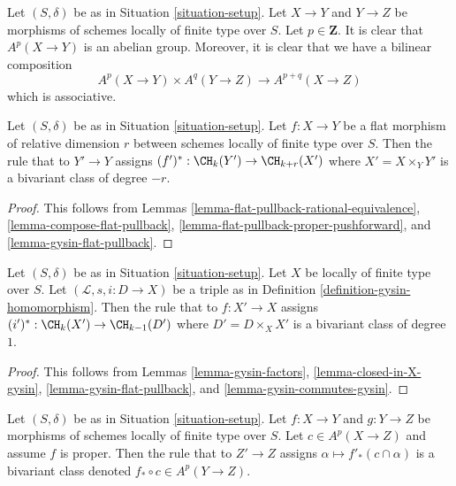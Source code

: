 \noindent
Let $(S, \delta)$ be as in Situation \ref{situation-setup}. Let $X \to Y$
and $Y \to Z$
be morphisms of schemes locally of finite type over $S$. Let
$p \in \mathbf{Z}$. It is clear that $A^p(X \to Y)$ is an abelian group.
Moreover, it is clear that we have a bilinear composition
$$
A^p(X \to Y) \times A^q(Y \to Z) \to A^{p + q}(X \to Z)
$$
which is associative.

\begin{lemma}
\label{lemma-flat-pullback-bivariant}
Let $(S, \delta)$ be as in Situation \ref{situation-setup}.
Let $f : X \to Y$ be a flat morphism of relative dimension $r$
between schemes locally of finite type over $S$.
Then the rule that to $Y' \to Y$ assigns
$(f')^* : \CH_k(Y') \to \CH_{k + r}(X')$ where $X' = X \times_Y Y'$
is a bivariant class of degree $-r$.
\end{lemma}

\begin{proof}
This follows from
Lemmas \ref{lemma-flat-pullback-rational-equivalence},
\ref{lemma-compose-flat-pullback},
\ref{lemma-flat-pullback-proper-pushforward}, and
\ref{lemma-gysin-flat-pullback}.
\end{proof}

\begin{lemma}
\label{lemma-gysin-bivariant}
Let $(S, \delta)$ be as in Situation \ref{situation-setup}.
Let $X$ be locally of finite type over $S$.
Let $(\mathcal{L}, s, i : D \to X)$ be a triple as in
Definition \ref{definition-gysin-homomorphism}.
Then the rule that to $f : X' \to X$ assigns
$(i')^* : \CH_k(X') \to \CH_{k - 1}(D')$ where $D' = D \times_X X'$
is a bivariant class of degree $1$.
\end{lemma}

\begin{proof}
This follows from Lemmas \ref{lemma-gysin-factors},
\ref{lemma-closed-in-X-gysin},
\ref{lemma-gysin-flat-pullback}, and
\ref{lemma-gysin-commutes-gysin}.
\end{proof}

\begin{lemma}
\label{lemma-push-proper-bivariant}
Let $(S, \delta)$ be as in Situation \ref{situation-setup}.
Let $f : X \to Y$ and $g : Y \to Z$ be morphisms of
schemes locally of finite type over $S$.
Let $c \in A^p(X \to Z)$ and assume $f$ is proper.
Then the rule that to $Z' \to Z$ assigns
$\alpha \longmapsto f'_*(c \cap \alpha)$
is a bivariant class denoted $f_* \circ c \in A^p(Y \to Z)$.
\end{lemma}

